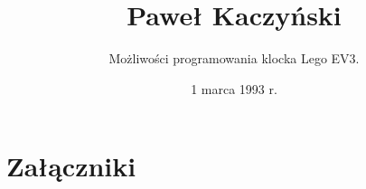 \documentclass[12pt, a4paper, notitlepage]{report}
\title{Paweł Kaczyński}
\author{Możliwości programowania klocka Lego EV3.}
\date{1 marca 1993 r.}
\begin{document}




\tableofcontents












\cleardoublepage
{}
{}
\listoffigures

\appendix
\chapter{Załączniki}
    
    
    
\end{document}

